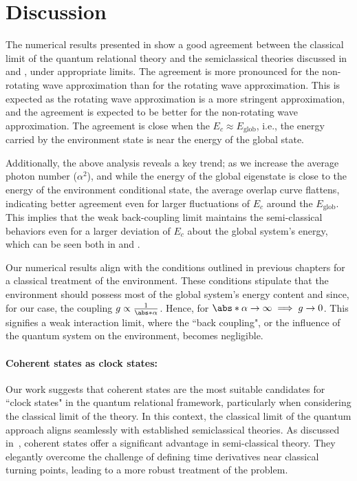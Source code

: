 \newpage 


\section{Discussion}
The numerical results presented in  show a good agreement 
between the classical limit of the quantum relational theory and the semiclassical theories
discussed in  and , under appropriate limits. 
The agreement is more pronounced for the non-rotating wave approximation than for the rotating wave approximation. This is expected as the rotating wave approximation is a more stringent approximation, and the
agreement is expected to be better for the non-rotating wave approximation.
The agreement is close when the \(E_c \approx E_{\mathrm{glob}}\), 
i.e., the energy carried by the environment state is near the energy of the global state. 

Additionally,  the above analysis reveals a key trend; as we increase the average photon number (\(\alpha^2\)), and while the energy 
of the global eigenstate is close to the energy of the environment conditional state, the average overlap curve flattens, indicating better agreement even for larger fluctuations of \(E_c\) around the \(E_{\mathrm{glob}}\). This implies that the weak back-coupling limit maintains the semi-classical behaviors even for a larger deviation of \(E_c\) about the global system's energy, which can be seen both in 
 and . 

Our numerical results align with the conditions outlined in previous chapters for a classical treatment of the environment. These conditions stipulate that the environment should possess most of the global system's energy content and since, for our case, the coupling \(g \propto \frac{1}{\abs*{\alpha}}\). Hence, for \(\abs*{\alpha} \to \infty \implies g \to 0\). This signifies a weak interaction limit, where the ``back coupling", or the influence of the quantum system on the environment, becomes negligible.

\paragraph{Coherent states as clock states:} Our work suggests that coherent states are the most suitable candidates for ``clock states" in the quantum relational framework, particularly when considering the classical limit of the theory. In this context, the classical limit of the quantum approach aligns seamlessly with established semiclassical theories. As discussed in~\cite{braun2004classical}, coherent states offer a significant advantage in semi-classical theory. They elegantly overcome the challenge of defining time derivatives near classical turning points, leading to a more robust treatment of the problem. 

